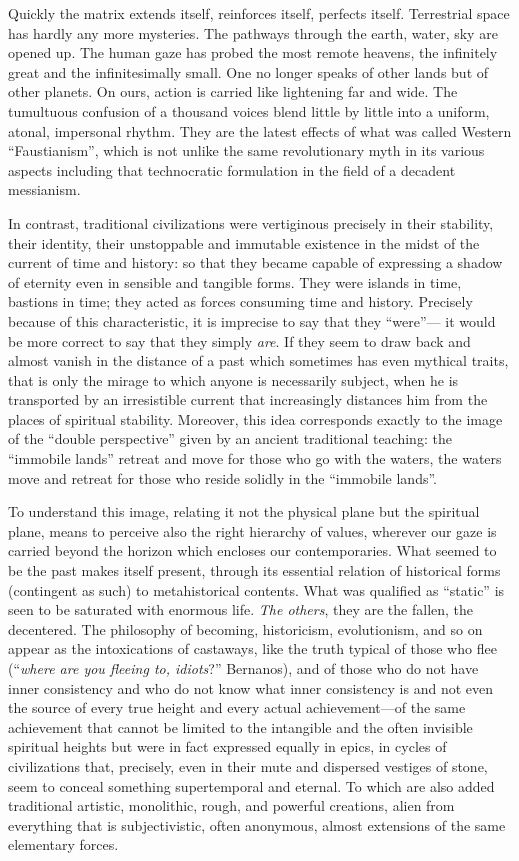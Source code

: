 Quickly the matrix extends itself, reinforces itself, perfects itself. Terrestrial space has hardly any more mysteries. The pathways through the earth, water, sky are opened up. The human gaze has probed the most remote heavens, the infinitely great and the infinitesimally small. One no longer speaks of other lands but of other planets. On ours, action is carried like lightening far and wide. The tumultuous confusion of a thousand voices blend little by little into a uniform, atonal, impersonal rhythm. They are the latest effects of what was called Western ``Faustianism'', which is not unlike the same revolutionary myth in its various aspects including that technocratic formulation in the field of a decadent messianism.

In contrast, traditional civilizations were vertiginous precisely in their stability, their identity, their unstoppable and immutable existence in the midst of the current of time and history: so that they became capable of expressing a shadow of eternity even in sensible and tangible forms. They were islands in time, bastions in time; they acted as forces consuming time and history. Precisely because of this characteristic, it is imprecise to say that they ``were''--- it would be more correct to say that they simply \emph{are}. If they seem to draw back and almost vanish in the distance of a past which sometimes has even mythical traits, that is only the mirage to which anyone is necessarily subject, when he is transported by an irresistible current that increasingly distances him from the places of spiritual stability. Moreover, this idea corresponds exactly to the image of the ``double perspective'' given by an ancient traditional teaching: the ``immobile lands'' retreat and move for those who go with the waters, the waters move and retreat for those who reside solidly in the ``immobile lands''.

To understand this image, relating it not the physical plane but the spiritual plane, means to perceive also the right hierarchy of values, wherever our gaze is carried beyond the horizon which encloses our contemporaries. What seemed to be the past makes itself present, through its essential relation of historical forms (contingent as such) to metahistorical contents. What was qualified as ``static'' is seen to be saturated with enormous life. \emph{The others}, they are the fallen, the decentered. The philosophy of becoming, historicism, evolutionism, and so on appear as the intoxications of castaways, like the truth typical of those who flee (``\emph{where are you fleeing to, idiots}?'' Bernanos), and of those who do not have inner consistency and who do not know what inner consistency is and not even the source of every true height and every actual achievement---of the same achievement that cannot be limited to the intangible and the often invisible spiritual heights but were in fact expressed equally in epics, in cycles of civilizations that, precisely, even in their mute and dispersed vestiges of stone, seem to conceal something supertemporal and eternal. To which are also added traditional artistic, monolithic, rough, and powerful creations, alien from everything that is subjectivistic, often anonymous, almost extensions of the same elementary forces.

